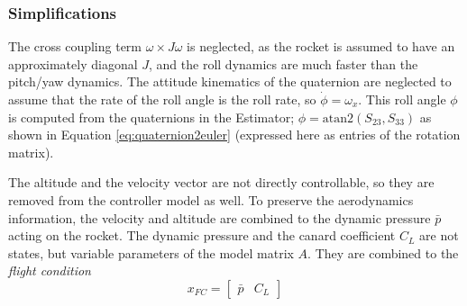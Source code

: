 \subsubsection{Simplifications}
The cross coupling term $\omega \times J \omega$ is neglected, as the rocket is assumed to have an approximately diagonal $J$, and the roll dynamics are much faster than the pitch/yaw dynamics. 
The attitude kinematics of the quaternion are neglected to assume that the rate of the roll angle is the roll rate, so $\dot \phi = \omega_x$.
This roll angle $\phi$ is computed from the quaternions in the Estimator; $\phi = \mathrm{atan2}( S_{23}, S_{33} )$ as shown in Equation \ref{eq:quaternion2euler} (expressed here as entries of the rotation matrix).

The altitude and the velocity vector are not directly controllable, so they are removed from the controller model as well. 
To preserve the aerodynamics information, the velocity and altitude are combined to the dynamic pressure $\bar p$ acting on the rocket. 
The dynamic pressure and the canard coefficient $C_L$ are not states, but variable parameters of the model matrix $A$.
They are combined to the \emph{flight condition}
\begin{equation}
    x_{FC} = \begin{bmatrix} \bar p & C_L \end{bmatrix} \label{eq:controller-model-fc}
\end{equation}

